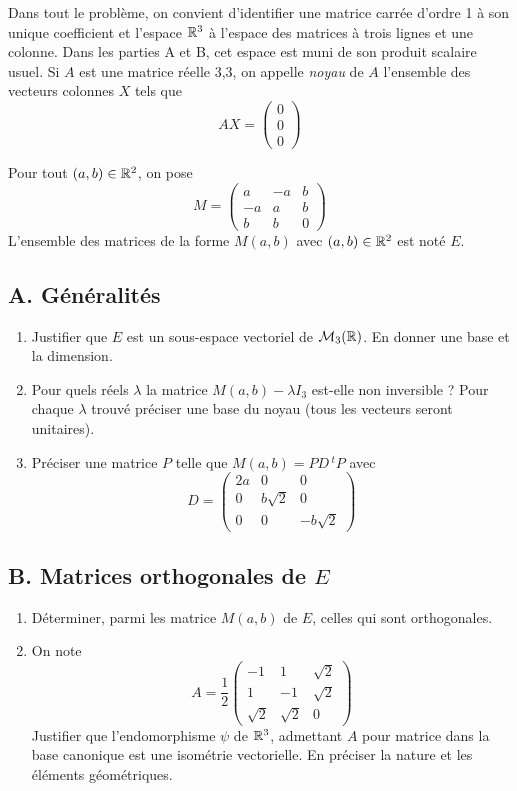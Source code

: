 Dans tout le problème, on convient d'identifier une matrice carrée d'ordre 1 à son unique coefficient et l'espace $\mathbb{R}^3$ à l'espace des matrices à trois lignes et une colonne. Dans les parties A et B, cet espace est muni de son produit scalaire usuel.\newline
Si $A$ est une matrice réelle 3,3, on appelle \emph{noyau} de $A$ l'ensemble des vecteurs colonnes $X$ tels que
\[AX=\begin{pmatrix}
0\\
0\\
0 \end{pmatrix}
\]

Pour tout $(a,b)\in\mathbb{R}^2$, on pose
\[
M=\begin{pmatrix}
a & -a & b\\
-a & a & b\\
b & b & 0
\end{pmatrix}
\]
L'ensemble des matrices de la forme $M(a,b)$ avec $(a,b)\in\mathbb{R}^2$ est noté $E$.
\subsection*{A. Généralités}
\begin{enumerate}
\item Justifier que $E$ est un sous-espace vectoriel de $\mathcal{M}_3(\mathbb{R})$. En donner une base et la dimension.
\item Pour quels réels $\lambda$ la matrice $M(a,b)-\lambda I_3$ est-elle non inversible ? Pour chaque $\lambda$ trouvé préciser une base du noyau (tous les vecteurs seront unitaires).
\item Préciser une matrice $P$ telle que $M(a,b)=PD\,{^tP}$ avec
\[
D=\begin{pmatrix}
2a & 0 & 0\\
0 & b\sqrt 2 & 0\\
0 & 0 & -b\sqrt 2
\end{pmatrix}
\]
\end{enumerate}
\subsection*{B. Matrices orthogonales de $E$}
\begin{enumerate}
\item Déterminer, parmi les matrice $M(a,b)$ de $E$, celles qui sont orthogonales.
\item On note
\[
A=\frac{1}{2}\begin{pmatrix}
-1 & 1 & \sqrt 2\\
1 & -1 & \sqrt 2\\
\sqrt 2 & \sqrt 2 & 0
\end{pmatrix}
\]
Justifier que l'endomorphisme $\psi$ de $\mathbb{R}^3$, admettant $A$ pour matrice dans la base canonique est une isométrie vectorielle. En préciser la nature et les éléments géométriques.
\end{enumerate}

